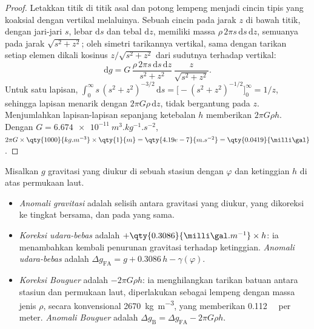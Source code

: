 \begin{proof}
Letakkan titik di titik asal dan potong lempeng menjadi cincin tipis yang koaksial dengan vertikal melaluinya. Sebuah cincin pada jarak $z$ di bawah titik, dengan jari-jari
$s$, lebar $\mathrm ds$ dan tebal $\mathrm dz$, memiliki massa
$\rho\,2\pi s\,\mathrm ds\,\mathrm dz$, semuanya pada jarak $\sqrt{s^2 + z^2}$;
oleh simetri tarikannya vertikal, sama dengan tarikan setiap elemen
dikali kosinus $z/\sqrt{s^2+z^2}$ dari sudutnya terhadap vertikal:
\[
  \mathrm dg = G\,\frac{\rho\,2\pi s\,\mathrm ds\,\mathrm dz}{s^2 + z^2}\,
  \frac{z}{\sqrt{s^2 + z^2}} .
\]
Untuk satu lapisan, $\int_0^\infty s\,(s^2 + z^2)^{-3/2}\,\mathrm ds =
\bigl[-(s^2 + z^2)^{-1/2}\bigr]_0^\infty = 1/z$, sehingga lapisan menarik dengan
$2\pi G\rho\,\mathrm dz$, tidak bergantung pada $z$. Menjumlahkan lapisan-lapisan sepanjang
ketebalan $h$ memberikan $2\pi G\rho h$. Dengan $G = \qty{6.674e-11}{m^3.kg^{-1}.s^{-2}}$,
$2\pi G\times\qty{1000}{kg.m^{-3}}\times\qty{1}{m} = \qty{4.19e-7}{m.s^{-2}} =
\qty{0.0419}{\milli\gal}$.
\end{proof}

\begin{definition}\label{def:b1:isostasy-gravity:anomalies}
Misalkan $g$ gravitasi yang diukur di sebuah stasiun dengan  $\varphi$ dan ketinggian $h$
di atas permukaan laut.
\begin{itemize}
  \item \emph{Anomali gravitasi} adalah selisih antara gravitasi yang diukur, yang dikoreksi ke tingkat bersama, dan  pada  yang sama.
  \item \emph{Koreksi udara-bebas} adalah
        $+\qty{0.3086}{\milli\gal.m^{-1}}\times h$: ia menambahkan kembali penurunan gravitasi terhadap ketinggian. \emph{Anomali udara-bebas} adalah
        $\Delta g_{\mathrm{FA}} = g + 0.3086\,h - \gamma(\varphi)$.
  \item \emph{Koreksi Bouguer} adalah $-2\pi G\rho h$:
        ia menghilangkan tarikan batuan antara stasiun dan permukaan laut, diperlakukan sebagai lempeng dengan massa jenis $\rho$, secara konvensional
        \qty{2670}{kg.m^{-3}}, yang memberikan \qty{0.112}{\milli\gal} per meter.
        \emph{Anomali Bouguer} adalah
        $\Delta g_{\mathrm B} = \Delta g_{\mathrm{FA}} - 2\pi G\rho h$.
\end{itemize}
\end{definition}

